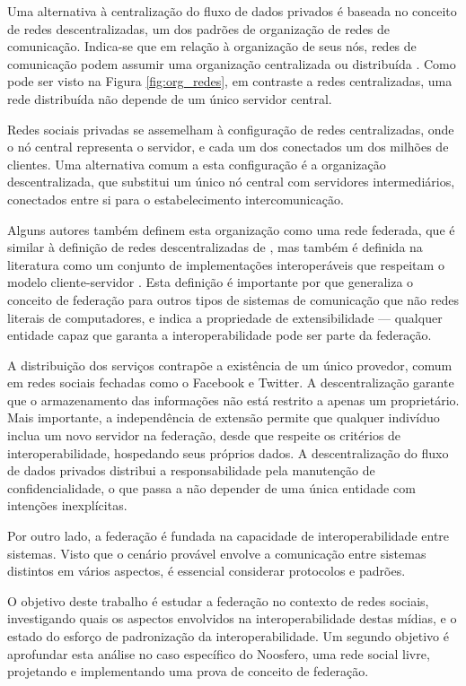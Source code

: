 Uma alternativa à centralização do fluxo de dados privados é baseada no conceito
de redes descentralizadas, um dos padrões de organização de redes de comunicação.
Indica-se que em relação à organização de seus nós, redes de comunicação podem
assumir uma organização centralizada ou distribuída \cite{baran1964}. Como pode ser
visto na Figura \ref{fig:org_redes}, em contraste a redes centralizadas, uma rede
distribuída não depende de um único servidor central.

Redes sociais privadas se assemelham à configuração de redes centralizadas, onde o
nó central representa o servidor, e cada um dos conectados um dos milhões de
clientes. Uma alternativa comum a esta configuração é a organização descentralizada,
que substitui um único nó central com servidores intermediários, conectados entre si
para o estabelecimento intercomunicação.

Alguns autores também definem esta organização como uma rede federada, que é similar
à definição de redes descentralizadas de \cite{baran1964}, mas também é definida na
literatura como um conjunto de implementações interoperáveis que respeitam o modelo
cliente-servidor \cite{barocas2012}. Esta definição é importante por que generaliza
o conceito de federação para outros tipos de sistemas de comunicação que não redes
literais de computadores, e indica a propriedade de extensibilidade --- qualquer
entidade capaz que garanta a interoperabilidade pode ser parte da federação.

A distribuição dos serviços contrapõe a existência de um único provedor, comum em
redes sociais fechadas como o Facebook e Twitter. A descentralização garante que o
armazenamento das informações não está restrito a apenas um proprietário. Mais
importante, a independência de extensão permite que qualquer indivíduo inclua um
novo servidor na federação, desde que respeite os critérios de interoperabilidade,
hospedando seus próprios dados. A descentralização do fluxo de dados privados
distribui a responsabilidade pela manutenção de confidencialidade, o que passa a não
depender de uma única entidade com intenções inexplícitas.

Por outro lado, a federação é fundada na capacidade de interoperabilidade entre
sistemas. Visto que o cenário provável envolve a comunicação entre sistemas
distintos em vários aspectos, é essencial considerar protocolos e padrões.

O objetivo deste trabalho é estudar a federação no contexto de redes sociais,
investigando quais os aspectos envolvidos na interoperabilidade destas mídias, e o
estado do esforço de padronização da interoperabilidade. Um segundo objetivo é
aprofundar esta análise no caso específico do Noosfero, uma rede social livre,
projetando e implementando uma prova de conceito de federação.

